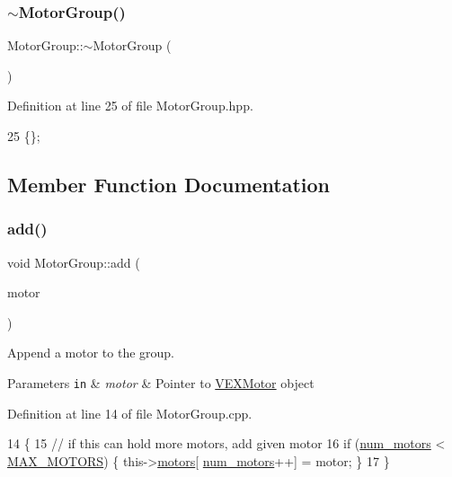 \subsubsection{\texorpdfstring{$\sim$\+Motor\+Group()}{~MotorGroup()}}
{\footnotesize\ttfamily Motor\+Group\+::$\sim$\+Motor\+Group (\begin{DoxyParamCaption}{ }\end{DoxyParamCaption})\hspace{0.3cm}{\ttfamily [inline]}}



Definition at line 25 of file Motor\+Group.\+hpp.


\begin{DoxyCode}
25 \{\};
\end{DoxyCode}


\subsection{Member Function Documentation}
\mbox{\label{class_motor_group_addfa8105bc2fe799db770b7777a7ee4f}} 
\subsubsection{\texorpdfstring{add()}{add()}}
{\footnotesize\ttfamily void Motor\+Group\+::add (\begin{DoxyParamCaption}\item[{\hyperlink{class_v_e_x_motor}{V\+E\+X\+Motor} $\ast$}]{motor }\end{DoxyParamCaption})}



Append a motor to the group. 


\begin{DoxyParams}[1]{Parameters}
\mbox{\tt in}  & {\em motor} & Pointer to \hyperlink{class_v_e_x_motor}{V\+E\+X\+Motor} object \\
\hline
\end{DoxyParams}


Definition at line 14 of file Motor\+Group.\+cpp.


\begin{DoxyCode}
14                                     \{
15     \textcolor{comment}{// if this can hold more motors, add given motor}
16     \textcolor{keywordflow}{if} (\hyperlink{class_motor_group_a93ffa3ad9fc210e6d2ed29b50dbf7292}{num\_motors} < \hyperlink{_motor_group_8hpp_a40dfd7fdfce455ce507bf3fed368c2ed}{MAX\_MOTORS}) \{ this->\hyperlink{class_motor_group_a8f2d6b4622a775ee0c5e95aafb83a1bb}{motors}[
      \hyperlink{class_motor_group_a93ffa3ad9fc210e6d2ed29b50dbf7292}{num\_motors}++] = motor; \}
17 \}
\end{DoxyCode}
\mbox{\label{class_motor_group_a0c2302784f8226542ded59b6812720ac}} 
